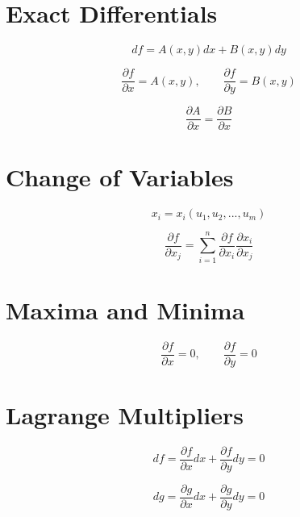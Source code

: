 \section{Exact Differentials}

\begin{equation*}
    df = A(x, y)dx + B(x, y)dy
\end{equation*}

\begin{equation*}
    \frac{\partial f}{\partial x} = A(x, y), \qquad \frac{\partial f}{\partial y} = B(x, y)
\end{equation*}

\begin{equation*}
    \frac{\partial A}{\partial x} = \frac{\partial B}{\partial x}
\end{equation*}

\section{Change of Variables}

\begin{equation*}
    x_i = x_i(u_1, u_2, ..., u_m)
\end{equation*}

\begin{equation*}
    \frac{\partial f}{\partial x_j} = 
    \sum_{i=1}^{n}\frac{\partial f}{\partial x_i}
    \frac{\partial x_i}{\partial x_j}
\end{equation*}

\section{Maxima and Minima}

\begin{equation*}
    \frac{\partial f}{\partial x} = 0, \qquad \frac{\partial f}{\partial y} = 0
\end{equation*}

\section{Lagrange Multipliers}

\begin{equation*}
    df = \frac{\partial f}{\partial x}dx + \frac{\partial f}{\partial y}dy = 0
\end{equation*}

\begin{equation*}
    dg = \frac{\partial g}{\partial x}dx + \frac{\partial g}{\partial y}dy = 0
\end{equation*}

